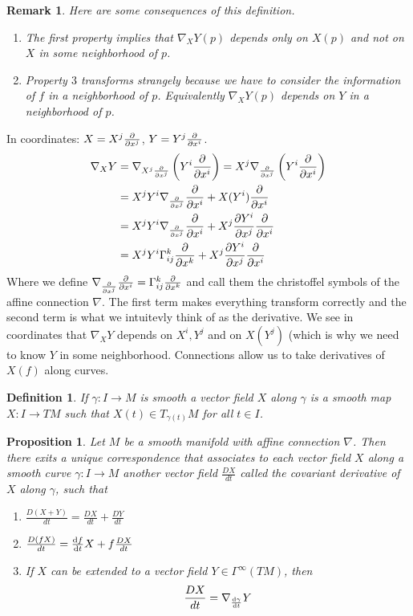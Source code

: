 \documentclass[a4paper]{article}
\newtheorem*{prop}{Proposition}
\newtheorem*{defn}{Definition}
\newtheorem*{rem}{Remark}
\begin{document}
\begin{rem} Here are some consequences of this definition.
  \begin{enumerate}
    \item The first property implies that $\nabla_X Y(p)$ depends only on $X(p)$ and not on $X$ in some neighborhood of $p$.
    \item Property $3$ transforms strangely because we have to consider the information of $f$ in a neighborhood of $p$. Equivalently $\nabla_X Y(p)$ depends on $Y$ in a neighborhood of $p$.
  \end{enumerate} 
\end{rem}

In coordinates: $X = X^j \pdv{x^j}$, $Y= Y^j \pdv{x^i}$.
\[
  \begin{aligned}
    \nabla_X Y &= \nabla_{X^j \pdv{x^j}} \left(Y^i \pdv{x^i} \right) = X^j \nabla_{\pdv{x^j}} \left(Y^i \pdv{x^i}  \right) \\
               &= X^j Y^i \nabla_{\pdv{x^j}} \pdv{x^i} + X(Y^i) \pdv{x^i} \\
               &= X^j Y^i \nabla_{\pdv{x^j}} \pdv{x^i} + X^j \pdv{Y^i}{x^j} \pdv{x^i} \\
               &= X^jY^i\Gamma^{k}_{ij} \pdv{x^k} + X^j \pdv{Y^i}{x^j}\pdv{x^i}
  \end{aligned}
\]
Where we define $\nabla_{\pdv{x^j}}\pdv{x^i} = \Gamma^{k}_{ij} \pdv{x^k}$  and call them the christoffel symbols of the affine connection $\nabla$. The first term makes everything transform correctly and the second term is what we intuitevly think of as the derivative. We see in coordinates that $\nabla_X Y$ depends on $X^i, Y^j$ and on $X(Y^j)$ (which is why we need to know $Y$ in some neighborhood. Connections allow us to take derivatives of $X(f)$ along curves.

\begin{defn}
  If $\gamma: I \rightarrow M$ is smooth a vector field $X$ along $\gamma$ is a smooth map $X: I \rightarrow TM$ such that $X(t) \in T_{\gamma(t)}M$ for all $t \in I$.
\end{defn}

\begin{prop}
  Let $M$ be a smooth manifold with affine connection $\nabla$. Then there exits a unique correspondence that associates to each vector field $X$ along a smooth curve $\gamma: I \rightarrow M$ another vector field $ \frac{DX}{dt}$ called the covariant derivative of $X$ along $\gamma$, such that
  \begin{enumerate}
    \item $\frac{D(X + Y)}{dt} = \frac{DX}{dt} + \frac{DY}{dt}$
    \item $\frac{D(fX)}{dt} = \dv{f}{t} X + f \frac{DX}{dt}$
    \item If $X$ can be extended to a vector field $Y \in \Gamma^{\infty}(TM)$, then 
      \[
        \frac{DX}{dt} = \nabla_{\dv{\gamma}{t}} Y
      \]
  \end{enumerate}
\end{prop}
\end{document}
